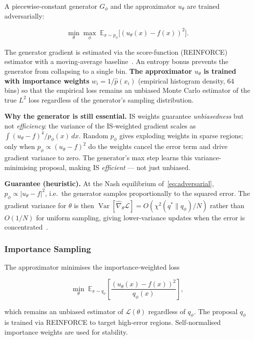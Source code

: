 \documentclass[11pt,a4paper]{article}
\begin{document}
A piecewise-constant generator $G_\phi$ and the approximator $u_\theta$
are trained adversarially:

\begin{equation}\label{eq:adversarial}
  \min_\theta\max_\phi\;
  \mathbb{E}_{x\sim p_\phi}\bigl[(u_\theta(x)-f(x))^2\bigr].
\end{equation}

The generator gradient is estimated via the score-function (REINFORCE)
estimator with a moving-average baseline~\citep{williams1992simple}.
An entropy bonus prevents the generator from collapsing to a single bin.
\textbf{The approximator $u_\theta$ is trained with importance weights}
$w_i = 1/\hat{p}(x_i)$ (empirical histogram density, 64 bins) so that
the empirical loss remains an unbiased Monte Carlo estimator of the
true $L^2$ loss regardless of the generator's sampling distribution.

\textbf{Why the generator is still essential.}
IS weights guarantee \emph{unbiasedness} but not \emph{efficiency}: the
variance of the IS-weighted gradient scales as
$\int (u_\theta-f)^4/p_\phi(x)\,dx$.  Random $p_\phi$ gives exploding
weights in sparse regions; only when $p_\phi\propto (u_\theta-f)^2$ do
the weights cancel the error term and drive gradient variance to zero.
The generator's max step learns this variance-minimising proposal,
making IS \emph{efficient} — not just unbiased.

\textbf{Guarantee (heuristic).}
At the Nash equilibrium of~\eqref{eq:adversarial}, $p_\phi\propto
|u_\theta-f|^2$, i.e.\ the generator samples proportionally to the
squared error.  The gradient variance for $\theta$ is then
$\operatorname{Var}[\hat\nabla_\theta\mathcal{L}] = O(\chi^2(q^*\|q_\phi)/N)$
rather than $O(1/N)$ for uniform sampling, giving lower-variance updates
when the error is concentrated~\citep{katharopoulos2018not}.

\subsubsection{Importance Sampling}
\label{sec:is}

The approximator minimises the importance-weighted loss

\begin{equation}
  \min_\theta\; \mathbb{E}_{x\sim q_\phi}\!\left[
    \frac{(u_\theta(x)-f(x))^2}{q_\phi(x)} \right],
\end{equation}

which remains an unbiased estimator of $\mathcal{L}(\theta)$ regardless
of $q_\phi$.  The proposal $q_\phi$ is trained via REINFORCE to target
high-error regions.  Self-normalised importance weights are used for
stability.
\end{document}
